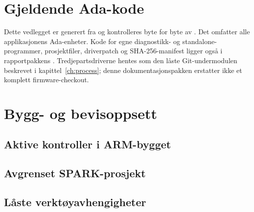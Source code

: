 \chapter{Gjeldende Ada-kode}
Dette vedlegget er generert fra  og kontrolleres byte for byte
av . Det omfatter alle
applikasjonens Ada-enheter. Kode for egne diagnostikk- og standalone-programmer, prosjektfiler,
driverpatch og SHA-256-manifest ligger også i rapportpakkens
. Tredjepartsdriverne hentes som den låste Git-undermodulen
beskrevet i kapittel~\ref{ch:process}; denne dokumentasjonspakken erstatter
ikke et komplett firmware-checkout.

\chapter{Bygg- og bevisoppsett}
\titlespacing*{\section}{0pt}{8pt}{3pt}
\lstset{aboveskip=3pt,belowskip=3pt}
\section*{Aktive kontroller i ARM-bygget}

\section*{Avgrenset SPARK-prosjekt}

\section*{Låste verktøyavhengigheter}

